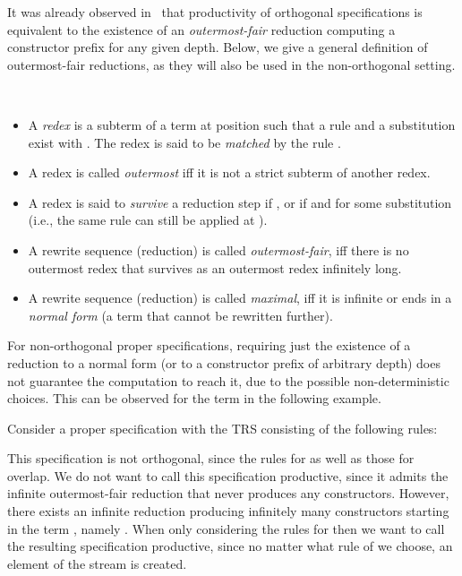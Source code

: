 \documentclass{eptcs}
\begin{document}
It was already observed in~\cite{EGH09,End10} that productivity of orthogonal
specifications is equivalent to the existence of an \emph{outermost-fair}
reduction computing a constructor prefix for any given depth. Below, we give a
general definition of outermost-fair reductions, as they will
also be used in the non-orthogonal setting.

\pagebreak[2]
\begin{definition}
\label{def:OutFair}
~
\begin{itemize}
\item
A \emph{redex} is a subterm  of a term  at position 
such that a rule  and a substitution  exist with
.
The redex  is said to be \emph{matched} by the rule .

\item
A redex is called \emph{outermost} iff it is not a strict subterm of another
redex.

\item
A redex  is said to \emph{survive} a reduction step
 if , or if  and
 for some substitution 
(i.e., the same rule can still be applied at ).


\item
A rewrite sequence (reduction) is called \emph{outermost-fair}, iff there is no
outermost redex that survives as an outermost redex infinitely long.

\item
A rewrite sequence (reduction) is called \emph{maximal}, iff it is infinite or
ends in a \emph{normal form} (a term that cannot be rewritten further).
\end{itemize}
\end{definition}


For non-orthogonal proper specifications, requiring just the existence of a
reduction to a normal form (or to a constructor prefix of arbitrary depth)
does not guarantee the computation to reach it, due to the possible
non-deterministic choices. This can be observed for the term 
in the following example.

\begin{example}
\label{ex:NonOrthoMaybeRnd}
Consider a proper specification with the TRS  consisting of the following
rules:


This specification is not orthogonal, since the rules for  as well
as those for  overlap.
We do not want to call this specification productive, since it admits the
infinite outermost-fair reduction 
that never produces any constructors. However, there exists an infinite
reduction producing infinitely many constructors starting in the term
, namely
.
When only considering the rules for  then we want to call
the resulting specification productive, since no matter what rule of
 we choose, an element of the stream is created.
\end{example}
\end{document}
